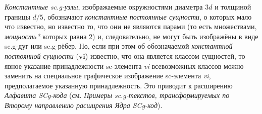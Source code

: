 \begin{SCn}
\begin{scnstruct}
\begin{scnsubstruct}
{\begin{scnitemize}
                    \item \textit{Константные sc.g-узлы}, изображаемые окружностями диаметра $3d$ и толщиной границы $d/5$, обозначают \textit{константные постоянные сущности}, о которых мало что известно, но известно то, что они не являются парами (то есть множествами, \textit{мощность*} которых равна 2) и, следовательно, не могут быть изображёны в виде sc.g-дуг или sc.g-рёбер. Но, если при этом об обозначаемой \textit{константной постоянной сущности} ($\bm{vi}$) известно, что она является классом сущностей, то явное указание принадлежности sc-элемента \textit{vi} всевозможных классов можно заменить на специальное графическое изображение sc-элемента \textit{vi}, предполагаемое указанную принадлежность. Это приводит к расширению  \textit{Алфавита SCg-кода} (см. \textit{Примеры sc.g-текстов, трансформируемых по Второму направлению расширения Ядра SCg-код}).
                \end{scnitemize}}



\end{scnsubstruct}
\end{scnstruct}
\end{SCn}
